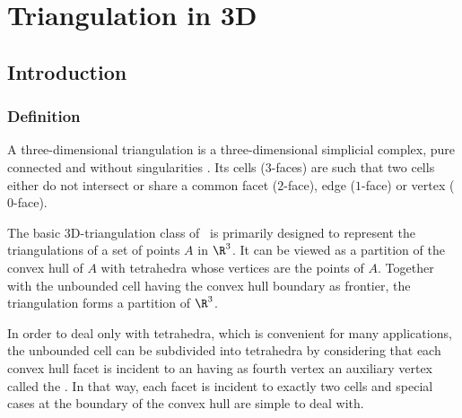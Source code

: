 \chapter{Triangulation in 3D}
\label{chapter-Triangulation3}\section{Introduction}
\label{Triangulation3-sec-intro}

\subsection{Definition}
\label{Triangulation3-sec-def}
A three-dimensional triangulation is a three-dimensional simplicial
complex, pure connected and without singularities \cite{by-ag-98}. Its
cells ($3$-faces) are such that two cells either do not intersect or
share a common facet ($2$-face), edge ($1$-face) or vertex ($0$-face).

The basic 3D-triangulation class of \cgal\ is primarily designed to
represent the triangulations of a set of points $A$ in $\R^3$.  It can
be viewed as a partition of the convex hull of {$A$} with tetrahedra
whose vertices are the points of {$A$}.  Together with the unbounded
cell having the convex hull boundary as frontier, the triangulation
forms a partition of $\R^3$.

In order to deal
only with tetrahedra, which is convenient for many applications, the
unbounded cell can be subdivided into tetrahedra by considering that
each convex hull facet is incident to an  having as
fourth vertex an auxiliary vertex called the .  In
that way, each facet is incident to exactly two cells and special cases
at the boundary of the convex hull are simple to deal with.

